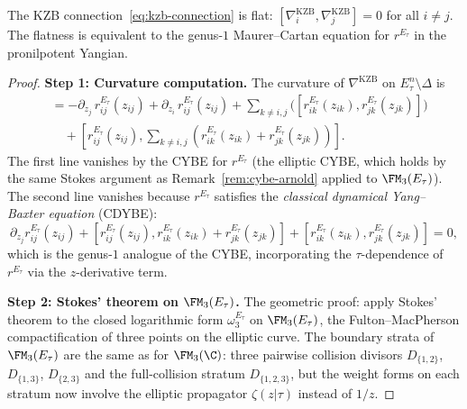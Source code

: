 \begin{theorem}
The KZB connection~\eqref{eq:kzb-connection} is flat:
$[\nabla_i^{\mathrm{KZB}}, \nabla_j^{\mathrm{KZB}}] = 0$ for
all $i \ne j$. The flatness is equivalent to the genus-$1$
Maurer--Cartan equation for $r^{E_\tau}$ in the pronilpotent
Yangian.
\end{theorem}

\begin{proof}
\noindent\textbf{Step 1: Curvature computation.}
The curvature of $\nabla^{\mathrm{KZB}}$ on
$E_\tau^n \setminus \Delta$ is
\begin{align*}
[\nabla_i, \nabla_j]
&= -\partial_{z_j}\, r_{ij}^{E_\tau}(z_{ij})
+ \partial_{z_i}\, r_{ij}^{E_\tau}(z_{ij})
+ \sum_{k \ne i,j}
\bigl([r_{ik}^{E_\tau}(z_{ik}), r_{jk}^{E_\tau}(z_{jk})]
\bigr) \\
&\quad + [r_{ij}^{E_\tau}(z_{ij}), \sum_{k \ne i,j}
(r_{ik}^{E_\tau}(z_{ik}) + r_{jk}^{E_\tau}(z_{jk}))].
\end{align*}
The first line vanishes by the CYBE for $r^{E_\tau}$ (the
elliptic CYBE, which holds by the same Stokes argument as
Remark~\ref{rem:cybe-arnold} applied to $\FM_3(E_\tau)$).
The second line vanishes because $r^{E_\tau}$ satisfies the
\emph{classical dynamical Yang--Baxter equation} (CDYBE):
\begin{equation}
\partial_{z_j} r_{ij}^{E_\tau}(z_{ij})
+ [r_{ij}^{E_\tau}(z_{ij}),
r_{ik}^{E_\tau}(z_{ik}) + r_{jk}^{E_\tau}(z_{jk})]
+ [r_{ik}^{E_\tau}(z_{ik}), r_{jk}^{E_\tau}(z_{jk})] = 0,
\end{equation}
which is the genus-$1$ analogue of the CYBE, incorporating the
$\tau$-dependence of $r^{E_\tau}$ via the $z$-derivative term.

\medskip
\noindent\textbf{Step 2: Stokes' theorem on $\FM_3(E_\tau)$.}
The geometric proof: apply Stokes' theorem to the closed logarithmic
form $\omega_3^{E_\tau}$ on $\FM_3(E_\tau)$, the Fulton--MacPherson
compactification of three points on the elliptic curve. The boundary
strata of $\FM_3(E_\tau)$ are the same as for $\FM_3(\C)$: three
pairwise collision divisors $D_{\{1,2\}}$, $D_{\{1,3\}}$,
$D_{\{2,3\}}$ and the full-collision stratum $D_{\{1,2,3\}}$, but
the weight forms on each stratum now involve the elliptic propagator
$\zeta(z|\tau)$ instead of $1/z$.


\end{proof}
